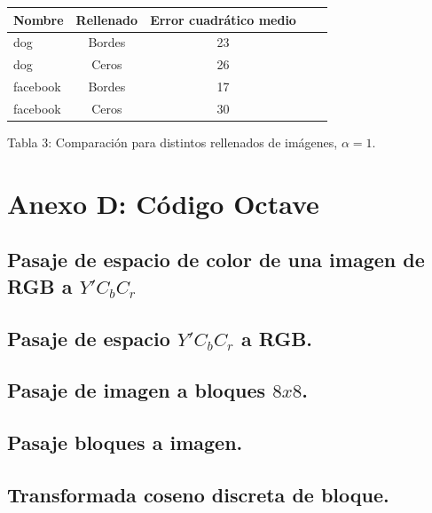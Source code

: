 \documentclass[%
	final,
	reprint,
	notitlepage,
	narroweqnarray,
	inline,
	twoside,
	invited
	]{ieee}
\begin{document}
\begin{center}
	\begin{tabular}{|l || c | c | c | c|}
		\hline
		\textbf{Nombre} & \textbf{Rellenado} & \textbf{Error cuadrático medio}\\
		\hline
		\hline
		dog & Bordes &  23\\
		dog & Ceros & 26\\
		facebook & Bordes & 17\\
		facebook & Ceros & 30\\
		\hline
	\end{tabular}
\end{center}
\begin{center}
Tabla 3: Comparación para distintos rellenados de imágenes, $\alpha=1$.
\end{center}

\section*{Anexo D: Código Octave}

\subsection{Pasaje de espacio de color de una imagen de RGB a $Y'C_bC_r$}


\subsection{Pasaje de espacio $Y'C_bC_r$ a RGB. }


\subsection{Pasaje de imagen a bloques $8x8$. }


\subsection{Pasaje bloques a imagen. }


\subsection{Transformada coseno discreta de bloque. }
\end{document}
